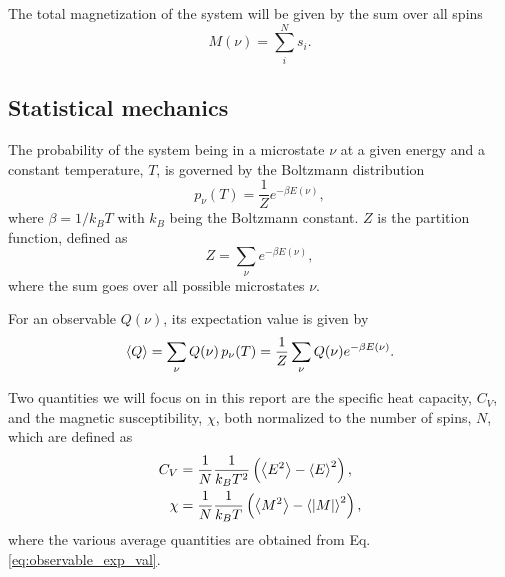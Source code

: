 The total magnetization of the system will be given by the sum over all spins 
\begin{equation}\label{eq:total_magnetization}
    M(\nu) = \sum_{i}^N s_i.
\end{equation}

\subsection{Statistical mechanics}\label{subsec_theory:statistical_mechanics}
The probability of the system being in a microstate $\nu$ at a given energy and a constant temperature, $T$, is governed by the Boltzmann distribution
\begin{equation}\label{eq:boltzmann_distr}
    p_\nu (T) = \frac{1}{Z}e^{-\beta E(\nu)},
\end{equation} 
where $\beta=1/k_B T$ with $k_B$ being the Boltzmann constant. $Z$ is the partition function, defined as 
\begin{equation}\label{eq:partition_function}
    Z = \sum_\nu e^{-\beta E(\nu)},
\end{equation}  
where the sum goes over all possible microstates $\nu$. 

For an observable $Q(\nu)$, its expectation value is given by 
\begin{equation}\label{eq:observable_exp_val}
    \expval{Q} = \sum_{\nu} Q(\nu)\, p_\nu(T) = \frac{1}{Z} \sum_\nu Q(\nu) e^{-\beta E(\nu)}.
\end{equation}

Two quantities we will focus on in this report are the specific heat capacity, $C_V$, and the magnetic susceptibility, $\chi$, both normalized to the number of spins, $N$, which are defined as 
\begin{align}
    C_V &= \frac{1}{N}\frac{1}{k_B T^2} \left( \expval{E^2} - \expval{E}^2 \right), \label{eq:C_V} \\ 
    \chi &= \frac{1}{N} \frac{1}{k_B T} \left( \expval{M^2} - \expval{\abs{M}}^2 \right), \label{eq:chi}
\end{align} 
where the various average quantities are obtained from Eq. \eqref{eq:observable_exp_val}. 

